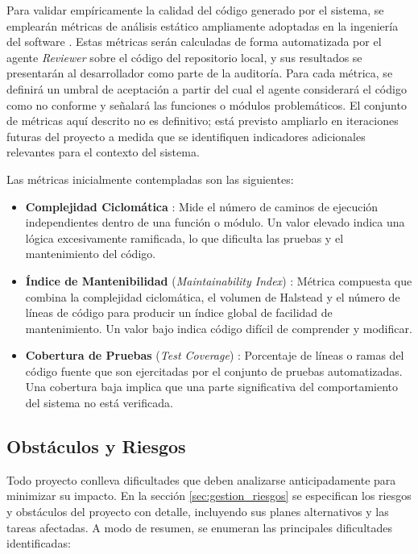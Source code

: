\documentclass[11pt, letterpaper]{article}
\begin{document}
Para validar empíricamente la calidad del código generado por el sistema, se emplearán métricas de análisis estático ampliamente adoptadas en la ingeniería del software \cite{sommerville_se_2015}. Estas métricas serán calculadas de forma automatizada por el agente \textit{Reviewer} sobre el código del repositorio local, y sus resultados se presentarán al desarrollador como parte de la auditoría. Para cada métrica, se definirá un umbral de aceptación a partir del cual el agente considerará el código como no conforme y señalará las funciones o módulos problemáticos. El conjunto de métricas aquí descrito no es definitivo; está previsto ampliarlo en iteraciones futuras del proyecto a medida que se identifiquen indicadores adicionales relevantes para el contexto del sistema.

Las métricas inicialmente contempladas son las siguientes:

\begin{itemize}
    \item \textbf{Complejidad Ciclomática} \cite{McCabe_Complexity}: Mide el número de caminos de ejecución independientes dentro de una función o módulo. Un valor elevado indica una lógica excesivamente ramificada, lo que dificulta las pruebas y el mantenimiento del código.

    \item \textbf{Índice de Mantenibilidad} (\textit{Maintainability Index}) \cite{microsoft_maintainability_index}: Métrica compuesta que combina la complejidad ciclomática, el volumen de Halstead y el número de líneas de código para producir un índice global de facilidad de mantenimiento. Un valor bajo indica código difícil de comprender y modificar.

    \item \textbf{Cobertura de Pruebas} (\textit{Test Coverage}) \cite{zhu_coverage_1997}: Porcentaje de líneas o ramas del código fuente que son ejercitadas por el conjunto de pruebas automatizadas. Una cobertura baja implica que una parte significativa del comportamiento del sistema no está verificada.
\end{itemize}

\subsection{Obstáculos y Riesgos}
Todo proyecto conlleva dificultades que deben analizarse anticipadamente para minimizar su impacto. En la sección \ref{sec:gestion_riesgos} se especifican los riesgos y obstáculos del proyecto con detalle, incluyendo sus planes alternativos y las tareas afectadas. A modo de resumen, se enumeran las principales dificultades identificadas:
\end{document}
